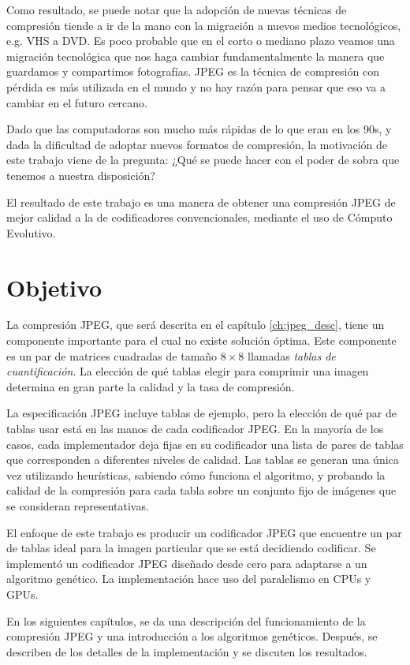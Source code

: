 Como resultado, se puede notar que la adopción de nuevas técnicas de compresión
tiende a ir de la mano con la migración a nuevos medios tecnológicos, e.g. VHS
a DVD. Es poco probable que en el corto o mediano plazo veamos una migración
tecnológica que nos haga cambiar fundamentalmente la manera que guardamos y
compartimos fotografías. JPEG es la técnica de \gls{compresión con pérdida} es más
utilizada en el mundo y no hay razón para pensar que eso va a cambiar en el
futuro cercano.

Dado que las computadoras son mucho más rápidas de lo que eran en los 90s, y
dada la dificultad de adoptar nuevos formatos de compresión, la motivación de
este trabajo viene de la pregunta:  ¿Qué se puede hacer con el poder de sobra
que tenemos a nuestra disposición?

El resultado de este trabajo es una manera de obtener una compresión JPEG de mejor
calidad a la de codificadores convencionales, mediante el uso de \gls{Cómputo Evolutivo}.

\section{Objetivo}

La compresión JPEG, que será descrita en el capítulo \ref{ch:jpeg_desc}, tiene
un componente importante para el cual no existe solución óptima. Este
componente es un par de matrices cuadradas de tamaño $8\times8$ llamadas
\emph{\gls{tablas de cuantificación}}. La elección de qué tablas elegir para
comprimir una imagen determina en gran parte la calidad y la tasa de compresión.

La especificación JPEG \cite{jpeg-spec} incluye tablas de ejemplo, pero la
elección de qué par de tablas usar está en las manos de cada codificador
JPEG. En la mayoría de los casos, cada implementador deja fijas en su
codificador una lista de pares de tablas que corresponden a diferentes
niveles de calidad. Las tablas se generan una única vez utilizando heurísticas,
sabiendo cómo funciona el algoritmo, y probando la calidad de la compresión
para cada tabla sobre un conjunto fijo de imágenes que se consideran
representativas.

El enfoque de este trabajo es producir un codificador JPEG que encuentre un par
de tablas ideal para la imagen particular que se está decidiendo codificar.
Se implementó un codificador JPEG diseñado desde cero para adaptarse a un
algoritmo genético. La implementación hace uso del paralelismo en CPUs y GPUs.

En los siguientes capítulos, se da una descripción del funcionamiento de la
compresión JPEG y una introducción a los algoritmos genéticos. Después, se
describen de los detalles de la implementación y se discuten los resultados.


